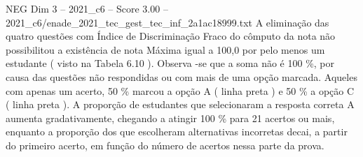 \begin{textsample}{NEG Dim 3 – 2021\_c6 – Score 3.00 – 2021\_c6/enade\_2021\_tec\_gest\_tec\_inf\_2a1ac18999.txt}
A eliminação das quatro questões com Índice de Discriminação Fraco do cômputo da nota não possibilitou a existência de nota Máxima igual a 100,0 por pelo menos um estudante ( visto na Tabela 6.10 ).
Observa -se que a soma não é 100 \%, por causa das questões não respondidas ou com mais de uma opção marcada.
Aqueles com apenas um acerto, 50 \% marcou a opção A ( linha preta ) e 50 \% a opção C ( linha preta ).
A proporção de estudantes que selecionaram a resposta correta A aumenta gradativamente, chegando a atingir 100 \% para 21 acertos ou mais, enquanto a proporção dos que escolheram alternativas incorretas decai, a partir do primeiro acerto, em função do número de acertos nessa parte da prova.

\end{textsample}
